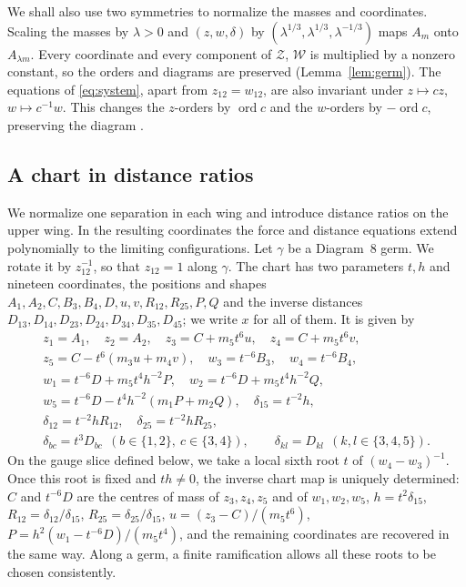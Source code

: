 \documentclass[Threeside,11pt]{article}
\theoremstyle{definition}
\theoremstyle{remark}
\numberwithin{equation}{section}
\theoremstyle{remark}
\newcommand{\ord}{\operatorname{ord}}
\begin{document}
We shall also use two symmetries to normalize the masses and coordinates.  Scaling the
masses by $\lambda>0$ and $(z,w,\delta)$ by
$(\lambda^{1/3},\lambda^{1/3},\lambda^{-1/3})$ maps $A_m$ onto $A_{\lambda m}$.
Every coordinate and every component of $\mathcal Z$, $\mathcal W$ is multiplied by a
nonzero constant, so the orders and diagrams are preserved (Lemma~\ref{lem:germ}).
The equations of \eqref{eq:system}, apart from $z_{12}=w_{12}$, are also invariant under
$z\mapsto cz$, $w\mapsto c^{-1}w$.  This changes the $z$-orders by $\ord c$ and the
$w$-orders by $-\ord c$, preserving the diagram \cite[p.~547]{AK}.

\subsection{A chart in distance ratios}
We normalize one separation in each wing and introduce distance ratios on
the upper wing.  In the resulting coordinates the force and distance equations
extend polynomially to the limiting configurations.
Let $\gamma$ be a Diagram~8 germ.  We rotate it by $z_{12}^{-1}$, so that $z_{12}=1$ along
$\gamma$.  The chart has two parameters $t,h$ and nineteen coordinates, the
positions and shapes $A_1,A_2,C,B_3,B_4,D,u,v,R_{12},R_{25},P,Q$ and the inverse distances
$D_{13},D_{14},D_{23},D_{24},D_{34},D_{35},D_{45}$; we write $x$ for all of them.  It is given by
\begin{gather*}
  z_1=A_1,\quad z_2=A_2,\quad z_3=C+m_5t^6u,\quad z_4=C+m_5t^6v,\\
  z_5=C-t^6(m_3u+m_4v),\quad w_3=t^{-6}B_3,\quad w_4=t^{-6}B_4,\\
  w_1=t^{-6}D+m_5t^4h^{-2}P,\quad w_2=t^{-6}D+m_5t^4h^{-2}Q,\\
  w_5=t^{-6}D-t^4h^{-2}(m_1P+m_2Q),\quad \delta_{15}=t^{-2}h,\\
  \delta_{12}=t^{-2}hR_{12},\quad \delta_{25}=t^{-2}hR_{25},\\
  \delta_{bc}=t^3D_{bc}\ \ (b\in\{1,2\},\ c\in\{3,4\}),\qquad
  \delta_{kl}=D_{kl}\ \ (k,l\in\{3,4,5\}).
\end{gather*}
{On the gauge slice defined below, we take a local sixth root $t$ of
$(w_4-w_3)^{-1}$.  Once this root is fixed and $th\ne0$, the inverse chart map is uniquely
determined: $C$ and $t^{-6}D$ are the centres of mass of $z_3,z_4,z_5$ and of}
$w_1,w_2,w_5$, $h=t^2\delta_{15}$, $R_{12}=\delta_{12}/\delta_{15}$,
$R_{25}=\delta_{25}/\delta_{15}$, $u=(z_3-C)/(m_5t^6)$, $P=h^2(w_1-t^{-6}D)/(m_5t^4)$, and
{the remaining coordinates are recovered in the same way.  Along a germ,
a finite ramification allows all these roots to be chosen consistently.}
\end{document}
